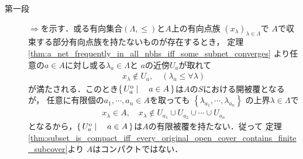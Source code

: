 	\begin{prf}\mbox{}
		\begin{description}
			\item[第一段]
				$\Longrightarrow$を示す．或る有向集合$(\Lambda,\leq)$と$A$上の有向点族
				$(x_\lambda)_{\lambda \in \Lambda}$で
				$A$で収束する部分有向点族を持たないものが存在するとき，
				定理\ref{thm:a_net_frequently_in_all_nbhs_iff_some_subnet_converges}
				より任意の$a \in A$に対し或る$\lambda_a \in \Lambda$と
				$a$の近傍$U_a$が取れて
				\begin{align}
					x_\lambda \notin U_a, \quad (\lambda_a \leq \forall \lambda)
				\end{align}
				が満たされる．このとき$\left\{\, U_a^{\mathrm{o}} \mid \quad a \in A\, \right\}$は$A$の$S$における開被覆となるが，
				任意に有限個の$a_1,\cdots,a_n \in A$を取っても
				$\left\{\lambda_{a_1},\cdots,\lambda_{a_n}\right\}$
				の上界$\lambda \in \Lambda$で
				\begin{align}
					x_\lambda \in A,
					\quad x_\lambda \notin U_{a_1} \cup U_{a_2} \cup \cdots \cup U_{a_n}
				\end{align}
				となるから，$\left\{\, U_a^{\mathrm{o}} \mid \quad a \in A\, \right\}$は$A$の有限被覆を持たない．従って
				定理\ref{thm:subset_is_compact_iff_every_original_open_cover_contains_finite_subcover}より
				$A$はコンパクトではない．
				

\end{description}
\end{prf}
